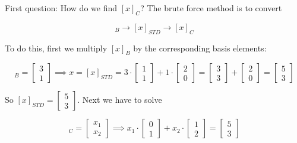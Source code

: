 \documentclass[11pt, oneside]{article}   	%
\begin{document}
\bigskip
\noindent
First question: How do we find $[x]_C$? The brute force method is to convert 

\begin{equation*}
[x]_B \rightarrow [x]_{STD} \rightarrow [x]_C
\end{equation*}

\bigskip
\noindent
To do this, first we multiply $[x]_B$ by the corresponding basis elements:

\begin{equation*}
[x]_B = \begin{bmatrix} 3 \\ 1 \end{bmatrix} \implies x =  [x]_{STD}   = 3 \cdot  \begin{bmatrix}  1 \\ 1\end{bmatrix} + 1 \cdot  \begin{bmatrix}  2 \\ 0\end{bmatrix} 
= \begin{bmatrix}  3 \\ 3 \end{bmatrix}  + \begin{bmatrix}  2 \\ 0\end{bmatrix} = \begin{bmatrix}  5 \\ 3\end{bmatrix} 
\end{equation*}

\bigskip
\noindent
So $[x]_{STD} = \begin{bmatrix}  5 \\ 3\end{bmatrix}$.  Next we have to solve 

\begin{equation*}
[x]_C = \begin{bmatrix} x_1 \\ x_2 \end{bmatrix} \implies x_1 \cdot \begin{bmatrix} 0 \\ 1 \end{bmatrix} + x_2 \cdot \begin{bmatrix} 1 \\  2 \end{bmatrix} =  \begin{bmatrix}  5 \\ 3\end{bmatrix}
\end{equation*} 
\end{document}
